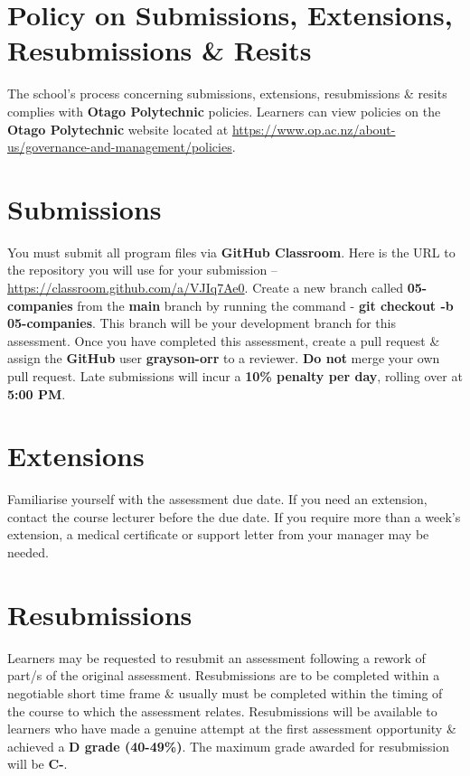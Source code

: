 \documentclass{article}
\begin{document}
\section*{Policy on Submissions, Extensions, Resubmissions \& Resits}
The school's process concerning submissions, extensions, resubmissions \& resits complies with \textbf{Otago Polytechnic} policies. Learners can view policies on the \textbf{Otago Polytechnic} website located at \href{https://www.op.ac.nz/about-us/governance-and-management/policies}{https://www.op.ac.nz/about-us/governance-and-management/policies}.

\section*{Submissions}
You must submit all program files via \textbf{GitHub Classroom}. Here is the URL to the repository you will use for your submission – \href{https://classroom.github.com/a/VJIq7Ae0}{https://classroom.github.com/a/VJIq7Ae0}. Create a new branch called  \textbf{05-companies} from the \textbf{main} branch by running the command - \textbf{git checkout -b 05-companies}. This branch will be your development branch for this assessment. Once you have completed this assessment, create a pull request \& assign the \textbf{GitHub} user \textbf{grayson-orr} to a reviewer. \textbf{Do not} merge your own pull request. Late submissions will incur a \textbf{10\% penalty per day}, rolling over at \textbf{5:00 PM}.

\section*{Extensions}
Familiarise yourself with the assessment due date. If you need an extension, contact the course lecturer before the due date. If you require more than a week's extension, a medical certificate or support letter from your manager may be needed.

\section*{Resubmissions}
Learners may be requested to resubmit an assessment following a rework of part/s of the original assessment. Resubmissions are to be completed within a negotiable short time frame \& usually must be completed within the timing of the course to which the assessment relates. Resubmissions will be available to learners who have made a genuine attempt at the first assessment opportunity \& achieved a \textbf{D grade (40-49\%)}. The maximum grade awarded for resubmission will be \textbf{C-}.
\end{document}
